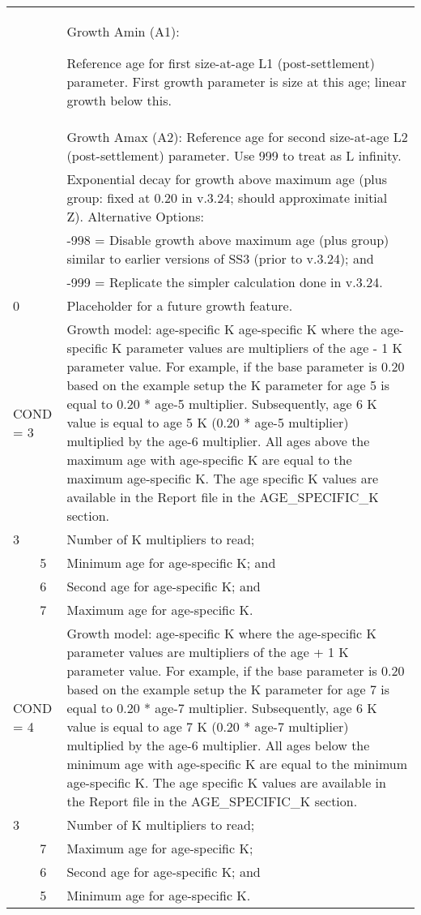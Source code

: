 \begin{longtable}{p{0.5cm} p{2cm} p{12.5cm}}
	\Tstrut 1 & & \hypertarget{Amin}{Growth Amin (A1):} Reference age for first size-at-age L1 (post-settlement) parameter. First growth parameter is size at this age; linear growth below this. \Bstrut\\

	\Tstrut 25 & & Growth Amax (A2): Reference age for second size-at-age L2 (post-settlement) parameter. Use 999 to treat as L infinity. \Bstrut\\
	\hline
	
	\Tstrut 0.20 & & Exponential decay for growth above maximum age (plus group: fixed at 0.20 in v.3.24; should approximate initial Z). Alternative Options: \\
				 & & -998 = Disable growth above maximum age (plus group) similar to earlier versions of SS3 (prior to v.3.24); and \\
				 & & -999 = Replicate the simpler calculation done in v.3.24. \Bstrut\\
	\hline
	
	0 & & Placeholder for a future growth feature. \Tstrut\Bstrut\\
	\hline

	\multicolumn{2}{l}{COND = 3} & Growth model: age-specific K age-specific K where the age-specific K parameter values are multipliers of the age - 1 K parameter value. For example, if the base parameter is 0.20 based on the example setup the K parameter for age 5 is equal to 0.20 * age-5 multiplier. Subsequently, age 6 K value is equal to age 5 K (0.20 * age-5 multiplier) multiplied by the age-6 multiplier. All ages above the maximum age with age-specific K are equal to the maximum age-specific K. The age specific K values are available in the Report file in the AGE\_SPECIFIC\_K section. \\
	3 & & Number of K multipliers to read; \\
	& 5 & Minimum age for age-specific K; and \\
	& 6 & Second age for age-specific K; and \\
	& 7 & Maximum age for age-specific K. \Bstrut\\
	
	\multicolumn{2}{l}{COND = 4} & Growth model: age-specific K where the age-specific K parameter values are multipliers of the age + 1 K parameter value. For example, if the base parameter is 0.20 based on the example setup the K parameter for age 7 is equal to 0.20 * age-7 multiplier. Subsequently, age 6 K value is equal to age 7 K (0.20 * age-7 multiplier) multiplied by the age-6 multiplier. All ages below the minimum age with age-specific K are equal to the minimum age-specific K. The age specific K values are available in the Report file in the AGE\_SPECIFIC\_K section. \\
	3 & & Number of K multipliers to read; \\
	  & 7 & Maximum age for age-specific K; \\
	  & 6 & Second age for age-specific K; and \\
	  & 5 & Minimum age for age-specific K. \Bstrut\\
	\hline
	

\end{longtable}
